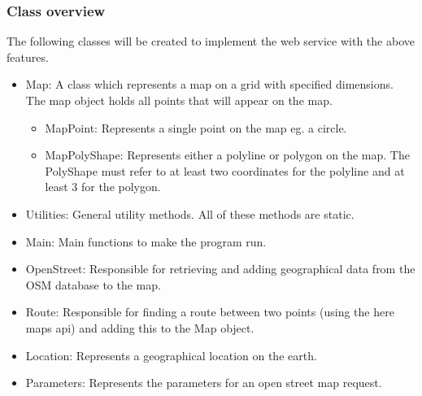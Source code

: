 \documentclass[11pt,twoside,a4paper]{article}
\begin{document}
\subsubsection{Class overview}

The following classes will be created to implement the web service with
the above features.
\begin{itemize}
\item Map: A class which represents a map on a grid with specified
  dimensions. The map object holds all points that will appear on the
  map.
  \begin{itemize}
  \item MapPoint: Represents a single point on the map eg. a circle.
  \item MapPolyShape: Represents either a polyline or polygon on the
    map. The PolyShape must refer to at least two coordinates for the
    polyline and at least 3 for the polygon.
  \end{itemize}
\item Utilities: General utility methods. All of these methods are
  static.
\item Main: Main functions to make the program run.
\item OpenStreet: Responsible for retrieving and adding geographical
  data from the OSM database to the map.
\item Route: Responsible for finding a route between two points (using
  the here maps api) and adding this to the Map object. 
\item Location: Represents a geographical location on the earth.
\item Parameters: Represents the parameters for an open street map request. 
\end{itemize}
\end{document}
